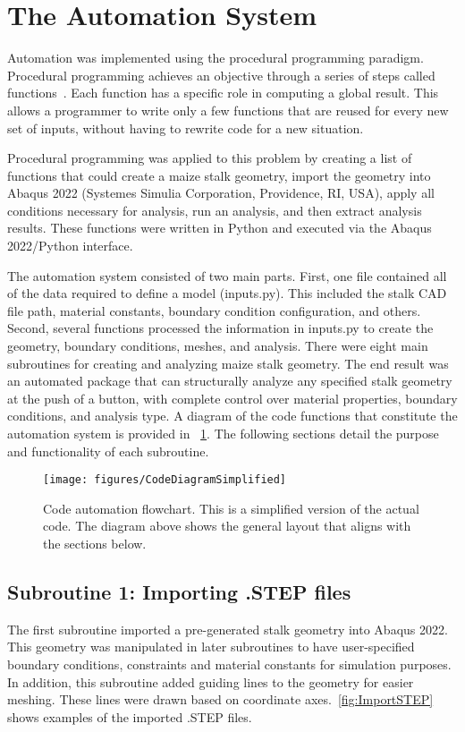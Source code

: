 \section{The Automation System}
\label{sec:the_automation_system}
Automation was implemented using the procedural programming paradigm. Procedural programming achieves an objective through a series of steps called functions~. Each function has a specific role in computing a global result. This allows a programmer to write only a few functions that are reused for every new set of inputs, without having to rewrite code for a new situation.

Procedural programming was applied to this problem by creating a list of functions that could create a maize stalk geometry, import the geometry into Abaqus 2022 (Systemes Simulia Corporation, Providence, RI, USA), apply all conditions necessary for analysis, run an analysis, and then extract analysis results. These functions were written in Python and executed via the Abaqus 2022/Python interface.

The automation system consisted of two main parts. First, one file contained all of the data required to define a model (inputs.py).  This included the stalk CAD file path, material constants, boundary condition configuration, and others. Second, several functions processed the information in inputs.py to create the geometry, boundary conditions, meshes, and analysis. There were eight main subroutines for creating and analyzing maize stalk geometry. The end result was an automated package that can structurally analyze any specified stalk geometry at the push of a button, with complete control over material properties, boundary conditions, and analysis type. A diagram of the code functions that constitute the automation system is provided in ~\cref{fig:CodeDiagramSimplified}. The following sections detail the purpose and functionality of each subroutine.

\begin{figure}[htbp]
	\centering
	\texttt{[image: figures/CodeDiagramSimplified]}
	\caption[Code automation flowchart.]{Code automation flowchart. This is a simplified version of the actual code. The diagram above shows the general layout that aligns with the sections below.}
	\label{fig:CodeDiagramSimplified}
\end{figure}

\subsection{Subroutine 1: Importing .STEP files}
\label{ssec:subroutine_1_importing_step_files}
The first subroutine imported a pre-generated stalk geometry into Abaqus 2022. This geometry was manipulated in later subroutines to have user-specified boundary conditions, constraints and material constants for simulation purposes. In addition, this subroutine added guiding lines to the geometry for easier meshing. These lines were drawn based on coordinate axes.~\cref{fig:ImportSTEP} shows examples of the imported .STEP files. 

